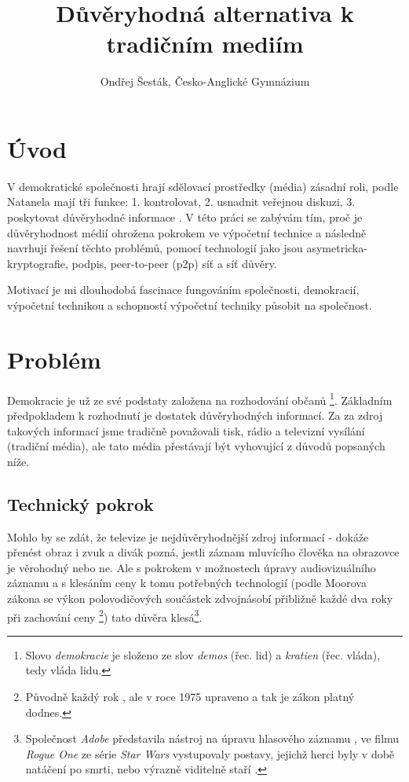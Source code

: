 \documentclass{report}
\begin{document}
\title{Důvěryhodná alternativa k tradičním mediím}
\author{Ondřej Šesták, Česko-Anglické Gymnázium}
\maketitle

\tableofcontents

\chapter{Úvod}
\label{ch:uvod}

V demokratické společnosti hrají sdělovací prostředky (média) zásadní roli, podle Natanela mají tři funkce: 1. kontrolovat, 2. usnadnit veřejnou diskuzi, 3. poskytovat důvěryhodné informace \citep{netanel01}. V této práci se zabývám tím, proč je důvěryhodnost médií ohrožena pokrokem ve výpočetní technice a následně navrhuji řešení těchto problémů, pomocí technologií jako jsou \gls{asymetricka-kryptografie}, \gls{podpis}, \gls{peer-to-peer} (\gls{p2p}) síť a síť důvěry.

Motivací je mi dlouhodobá fascinace fungováním společnosti, demokracií, výpočetní technikou a schopností výpočetní techniky působit na společnost.

\chapter{Problém}
\label{ch:problem}

Demokracie je už ze své podstaty založena na rozhodování občanů \footnote{Slovo \textit{demokracie} je složeno ze slov \textit{demos} (řec. lid) a \textit{kratien} (řec. vláda), tedy vláda lidu.}. Základním předpokladem k rozhodnutí je dostatek důvěryhodných informací. Za za zdroj takových informací jsme tradičně považovali tisk, rádio a televizní vysílání (tradiční média), ale tato média přestávají být vyhovující z důvodů popsaných níže.

\section{Technický pokrok}
\label{sec:technicky_pokrok}
Mohlo by se zdát, že televize je nejdůvěryhodnější zdroj informací - dokáže přenést obraz i zvuk a divák pozná, jestli záznam mluvícího člověka na obrazovce je věrohodný nebo ne. Ale s pokrokem v možnostech úpravy audiovizuálního záznamu a s klesáním ceny k tomu potřebných technologií (podle Moorova zákona se výkon polovodičových součástek zdvojnásobí přibližně každé dva roky při zachování ceny \citep{moore75}\footnote{Původně každý rok \citep{moore65}, ale v roce 1975 upraveno a tak je zákon platný dodnes.}) tato důvěra klesá\footnote{Společnost \textit{Adobe} představila nástroj na úpravu hlasového záznamu \citep{anthony16}, ve filmu \textit{Rogue One} ze série \textit{Star Wars} vystupovaly postavy, jejichž herci byly v době natáčení po smrti, nebo výrazně viditelně staří \citep{cooper17}.}.
\end{document}
